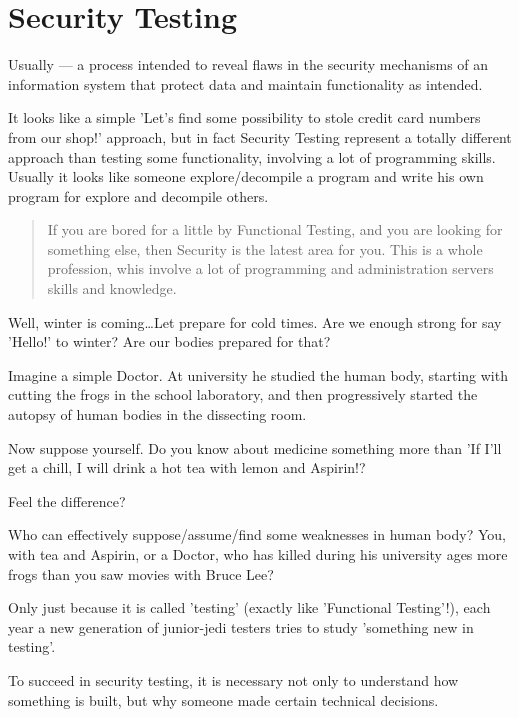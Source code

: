 \section{Security Testing}
\label{sec:Security Testing}

Usually — a process intended to reveal flaws in the security mechanisms of an information system that protect data and maintain functionality as intended.

It looks like a simple 'Let's find some possibility to stole credit card numbers from our shop!' approach, but in fact Security Testing represent a totally different approach than testing some functionality, involving a lot of programming skills. Usually it looks like someone explore/decompile a program and write his own program for explore and decompile others.

\begin{quote}
 If you are bored for a little by Functional Testing, and you are looking for something else, then Security is the latest area for you. This is a whole profession, whis involve a lot of programming and administration servers skills and knowledge.
\end{quote} 

Well, winter is coming\ldots Let prepare for cold times. Are we enough strong for say 'Hello!' to winter? Are our bodies prepared for that?

Imagine a simple Doctor. At university he studied the human body, starting with cutting the frogs in the school laboratory, and then progressively started the autopsy of human bodies in the dissecting room.

Now suppose yourself. Do you know about medicine something more than 'If I'll get a chill, I will drink a hot tea with lemon and Aspirin!?

Feel the difference?

Who can effectively suppose/assume/find some weaknesses in human body? You, with tea and Aspirin, or a Doctor, who has killed during his university ages more frogs than you saw movies with Bruce Lee?

Only just because it is called 'testing' (exactly like 'Functional Testing'!), each year a new generation of junior-jedi testers tries to study 'something new in testing'.

To succeed in security testing, it is necessary not only to understand how something is built, but why someone made certain technical decisions.